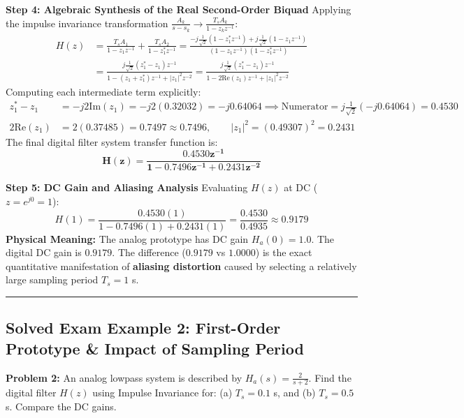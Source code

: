 \documentclass[11pt,a4paper]{article}
\begin{document}
\noindent\textbf{Step 4: Algebraic Synthesis of the Real Second-Order Biquad}
Applying the impulse invariance transformation $\frac{A_k}{s - s_k} \to \frac{T_s A_k}{1 - z_k z^{-1}}$:
\begin{align}
H(z) &= \frac{T_s A_1}{1 - z_1 z^{-1}} + \frac{T_s A_2}{1 - z_1^* z^{-1}} = \frac{-j \frac{1}{\sqrt{2}}(1 - z_1^* z^{-1}) + j \frac{1}{\sqrt{2}}(1 - z_1 z^{-1})}{(1 - z_1 z^{-1})(1 - z_1^* z^{-1})} \nonumber \\
&= \frac{j \frac{1}{\sqrt{2}}(z_1^* - z_1) z^{-1}}{1 - (z_1 + z_1^*) z^{-1} + |z_1|^2 z^{-2}} = \frac{j \frac{1}{\sqrt{2}}(z_1^* - z_1) z^{-1}}{1 - 2\text{Re}(z_1) z^{-1} + |z_1|^2 z^{-2}}
\end{align}
Computing each intermediate term explicitly:
\begin{align}
z_1^* - z_1 &= -j 2\text{Im}(z_1) = -j 2(0.32032) = -j 0.64064 \implies \text{Numerator} = j \frac{1}{\sqrt{2}} (-j 0.64064) = \mathbf{0.4530} \nonumber \\
2\text{Re}(z_1) &= 2(0.37485) = \mathbf{0.7497} \approx \mathbf{0.7496}, \qquad |z_1|^2 = (0.49307)^2 = \mathbf{0.2431}
\end{align}
The final digital filter system transfer function is:
\begin{equation}
\mathbf{H(z) = \frac{0.4530 z^{-1}}{1 - 0.7496 z^{-1} + 0.2431 z^{-2}}}
\end{equation}

\noindent\textbf{Step 5: DC Gain and Aliasing Analysis}
Evaluating $H(z)$ at DC ($z = e^{j0} = 1$):
\begin{equation}
H(1) = \frac{0.4530(1)}{1 - 0.7496(1) + 0.2431(1)} = \frac{0.4530}{0.4935} \approx \mathbf{0.9179}
\end{equation}
\textbf{Physical Meaning:} The analog prototype has DC gain $H_a(0) = 1.0$. The digital DC gain is $0.9179$. The difference ($0.9179$ vs $1.0000$) is the exact quantitative manifestation of \textbf{aliasing distortion} caused by selecting a relatively large sampling period $T_s = 1$ s.

\noindent\rule{\textwidth}{0.5pt}

\subsection*{Solved Exam Example 2: First-Order Prototype \& Impact of Sampling Period}

\textbf{Problem 2:} An analog lowpass system is described by $H_a(s) = \frac{2}{s + 2}$. Find the digital filter $H(z)$ using Impulse Invariance for: (a) $T_s = 0.1$ s, and (b) $T_s = 0.5$ s. Compare the DC gains.
\end{document}
